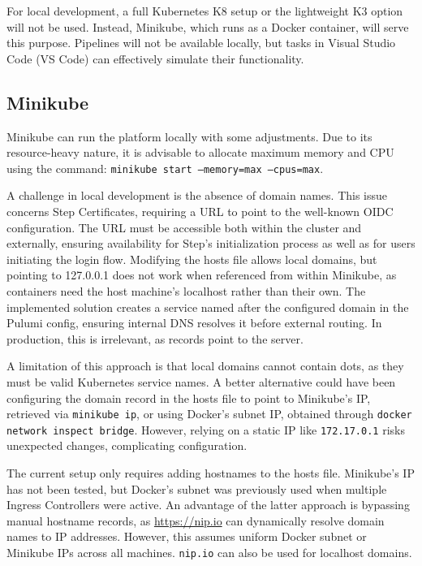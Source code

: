 For local development, a full Kubernetes K8 setup or the lightweight K3 option will not be used. Instead, Minikube, which runs as a Docker container, will serve this purpose. Pipelines will not be available locally, but tasks in Visual Studio Code (VS Code) can effectively simulate their functionality.

\subsection{Minikube}
Minikube can run the platform locally with some adjustments. Due to its resource-heavy nature, it is advisable to allocate maximum memory and CPU using the command: \texttt{minikube start --memory=max --cpus=max}.

A challenge in local development is the absence of domain names. This issue concerns Step Certificates, requiring a URL to point to the well-known OIDC configuration. The URL must be accessible both within the cluster and externally, ensuring availability for Step's initialization process as well as for users initiating the login flow. Modifying the hosts file allows local domains, but pointing to 127.0.0.1 does not work when referenced from within Minikube, as containers need the host machine's localhost rather than their own. The implemented solution creates a service named after the configured domain in the Pulumi config, ensuring internal DNS resolves it before external routing. In production, this is irrelevant, as records point to the server.

A limitation of this approach is that local domains cannot contain dots, as they must be valid Kubernetes service names. A better alternative could have been configuring the domain record in the hosts file to point to Minikube's IP, retrieved via \texttt{minikube ip}, or using Docker's subnet IP, obtained through \texttt{docker network inspect bridge}. However, relying on a static IP like \texttt{172.17.0.1} risks unexpected changes, complicating configuration.

The current setup only requires adding hostnames to the hosts file. Minikube's IP has not been tested, but Docker's subnet was previously used when multiple Ingress Controllers were active. An advantage of the latter approach is bypassing manual hostname records, as \url{https://nip.io} can dynamically resolve domain names to IP addresses. However, this assumes uniform Docker subnet or Minikube IPs across all machines. \texttt{nip.io} can also be used for localhost domains.

